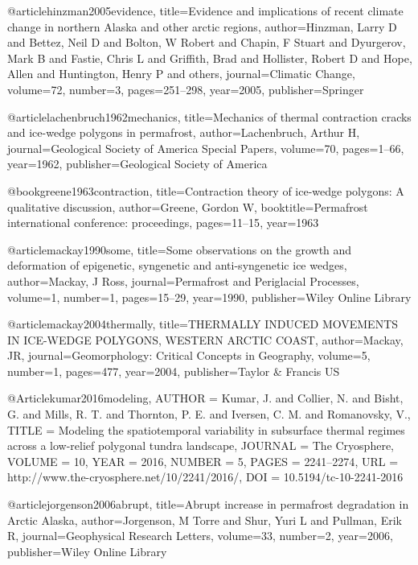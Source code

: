 \begin{thebibliography}{}
@article{hinzman2005evidence,
  title={Evidence and implications of recent climate change in northern Alaska and other arctic regions},
  author={Hinzman, Larry D and Bettez, Neil D and Bolton, W Robert and Chapin, F Stuart and Dyurgerov, Mark B and Fastie, Chris L and Griffith, Brad and Hollister, Robert D and Hope, Allen and Huntington, Henry P and others},
  journal={Climatic Change},
  volume={72},
  number={3},
  pages={251--298},
  year={2005},
  publisher={Springer}
}

@article{lachenbruch1962mechanics,
  title={Mechanics of thermal contraction cracks and ice-wedge polygons in permafrost},
  author={Lachenbruch, Arthur H},
  journal={Geological Society of America Special Papers},
  volume={70},
  pages={1--66},
  year={1962},
  publisher={Geological Society of America}
}

@book{greene1963contraction,
  title={Contraction theory of ice-wedge polygons: A qualitative discussion},
  author={Greene, Gordon W},
  booktitle={Permafrost international conference: proceedings},
  pages={11--15},
  year={1963}
}

@article{mackay1990some,
  title={Some observations on the growth and deformation of epigenetic, syngenetic and anti-syngenetic ice wedges},
  author={Mackay, J Ross},
  journal={Permafrost and Periglacial Processes},
  volume={1},
  number={1},
  pages={15--29},
  year={1990},
  publisher={Wiley Online Library}
}


@article{mackay2004thermally,
  title={THERMALLY INDUCED MOVEMENTS IN ICE-WEDGE POLYGONS, WESTERN ARCTIC COAST},
  author={Mackay, JR},
  journal={Geomorphology: Critical Concepts in Geography},
  volume={5},
  number={1},
  pages={477},
  year={2004},
  publisher={Taylor \& Francis US}
}


@Article{kumar2016modeling,
AUTHOR = {Kumar, J. and Collier, N. and Bisht, G. and Mills, R. T. and Thornton, P. E. and Iversen, C. M. and Romanovsky, V.},
TITLE = {Modeling the spatiotemporal variability in subsurface thermal regimes across a low-relief polygonal tundra landscape},
JOURNAL = {The Cryosphere},
VOLUME = {10},
YEAR = {2016},
NUMBER = {5},
PAGES = {2241--2274},
URL = {http://www.the-cryosphere.net/10/2241/2016/},
DOI = {10.5194/tc-10-2241-2016}
}

@article{jorgenson2006abrupt,
  title={Abrupt increase in permafrost degradation in Arctic Alaska},
  author={Jorgenson, M Torre and Shur, Yuri L and Pullman, Erik R},
  journal={Geophysical Research Letters},
  volume={33},
  number={2},
  year={2006},
  publisher={Wiley Online Library}
}


\end{thebibliography}
